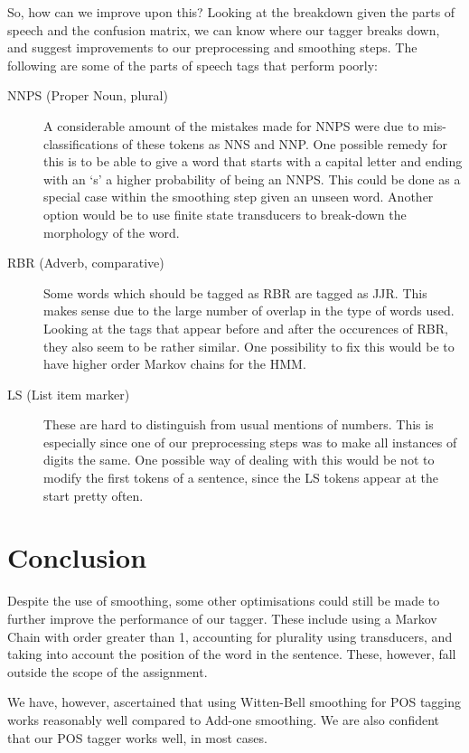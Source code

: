 \documentclass[12pt]{homework}
\begin{document}
So, how can we improve upon this? Looking at the breakdown given the parts of 
speech and the confusion matrix, we can know where our tagger breaks down, and 
suggest improvements to our preprocessing and smoothing steps. The following are 
some of the parts of speech tags that perform poorly:
\begin{description}
	\item[NNPS (Proper Noun, plural)] A considerable amount of the mistakes made 
		for NNPS were due to mis-classifications of these tokens as NNS and NNP.  
		One possible remedy for this is to be able to give a word that starts 
		with a capital letter and ending with an `s' a higher probability of 
		being an NNPS. This could be done as a special case within the smoothing 
		step given an unseen word. Another option would be to use finite state 
		transducers to break-down the morphology of the word.
	\item[RBR (Adverb, comparative)] Some words which should be tagged as RBR 
		are tagged as JJR. This makes sense due to the large number of overlap 
		in the type of words used. Looking at the tags that appear before and 
		after the occurences of RBR, they also seem to be rather similar. One 
		possibility to fix this would be to have higher order Markov chains for 
		the HMM.
	\item[LS (List item marker)] These are hard to distinguish from usual 
		mentions of numbers.  This is especially since one of our preprocessing 
		steps was to make all instances of digits the same. One possible way of 
		dealing with this would be not to modify the first tokens of a sentence, 
		since the LS tokens appear at the start pretty often.
\end{description}

\section{Conclusion}
Despite the use of smoothing, some other optimisations could still be made to 
further improve the performance of our tagger. These include using a Markov 
Chain with order greater than 1, accounting for plurality using transducers, and 
taking into account the position of the word in the sentence. These, however, 
fall outside the scope of the assignment.

We have, however, ascertained that using Witten-Bell smoothing for POS tagging 
works reasonably well compared to Add-one smoothing. We are also confident that 
our POS tagger works well, in most cases.
\end{document}
